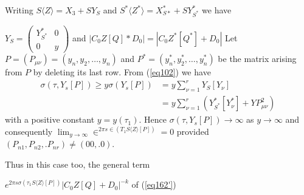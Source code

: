 Writing $S \langle Z \rangle = X_3 + SY_S$  and  $S^* \langle Z ^*
\rangle = X^*_{S*} +  SY^*_{S^*}$  
we have

\noindent
$Y_S=\begin{pmatrix}Y_{S^*}^* & 0\\ 0 & y \end{pmatrix}$ and $| C_0 Z
    [Q]*  D_0 | = | C_0 Z^* [Q^*] + D_0|$ Let $P = (P_{\mu \nu}) =
    (y_n,y_2,\ldots,y_n) $ and $P^* = (y_n^*, y_2^*, \ldots, y_n^*)$
    be the matrix arising from $P$ by deleting its last row. From
    (\ref{eq102}) we have 
\begin{align*}
\sigma (\tau , Y_s[P])\geq y \sigma (Y_s [P]) &= y
\sum_{\nu=1}^r Y_S[Y_{\nu}]\\ 
&= y \sum_{\nu =1}^r (Y_{S^*}^*[Y_\nu^* ] + YP_{\mu\nu}^2) 
\end{align*}
with a positive constant $y = y(\tau_1)$. Hence
$\sigma(\tau, Y_s[P])\to \infty$ as $y \to \infty$ and consequently
$\lim_{y \to \infty} \in^{2 \pi s \in (T_1 S \langle Z \rangle[P])}=0$ 
provided $(P_{n1}, P_{n2},.P_{nr} ) \neq (0  0 ,. 0)$.

Thus in this case too, the general term

\noindent
$e^{2 \pi s \sigma(\tau_1S \langle Z \rangle [P])} | C_0 Z [Q] + D_0
|^{-k}$ of (\ref{eq162'}) 

